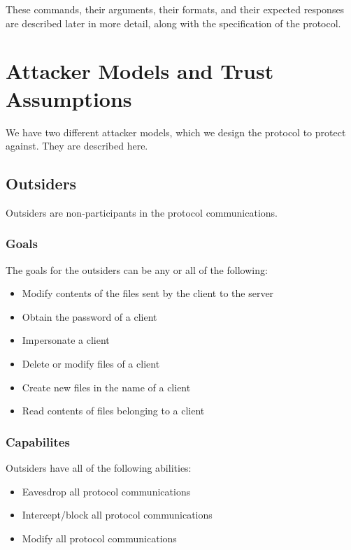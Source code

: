 \documentclass[12pt]{article}
\begin{document}
\noindent These commands, their arguments, their formats, and their expected responses are described later in more detail, along with the specification of the protocol. 

\section{Attacker Models and Trust Assumptions}

We have two different attacker models, which we design the protocol to protect against. They are described here.

\subsection{Outsiders}

Outsiders are non-participants in the protocol communications.

\subsubsection{Goals}

The goals for the outsiders can be any or all of the following:

\begin{itemize}
    \item Modify contents of the files sent by the client to the server
    \item Obtain the password of a client
    \item Impersonate a client
    \item Delete or modify files of a client
    \item Create new files in the name of a client
    \item Read contents of files belonging to a client
\end{itemize}

\subsubsection{Capabilites}

Outsiders have all of the following abilities:

\begin{itemize}
    \item Eavesdrop all protocol communications
    \item Intercept/block all protocol communications
    \item Modify all protocol communications
\end{itemize}
\end{document}
